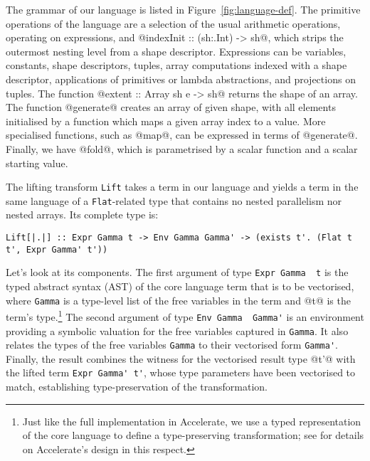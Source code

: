 The grammar of our language is listed in Figure~\ref{fig:language-def}. The primitive operations of the language are a selection of the usual arithmetic operations, operating on expressions, and @indexInit :: (sh:.Int) -> sh@, which strips the outermost nesting level from a shape descriptor. Expressions can be variables, constants, shape descriptors, tuples, array computations indexed with a shape descriptor, applications of primitives or lambda abstractions, and projections on tuples. The function @extent :: Array sh e -> sh@ returns the shape of an array. The function @generate@ creates an array of given shape, with all elements initialised by a function which maps a given array index to a value. More specialised functions, such as @map@, can be expressed in terms of @generate@. Finally, we have @fold@, which is parametrised by a scalar function and a scalar starting value.

The lifting transform \lstinline[style=ndp]{Lift} takes a term in our language and yields a term in the same language of a \lstinline[style=ndp]{Flat}-related type that contains no nested parallelism nor nested arrays. Its complete type is:
%
\begin{lstlisting}[style=ndp]
Lift[|.|] :: Expr Gamma t -> Env Gamma Gamma' -> (exists t'. (Flat t t', Expr Gamma' t'))
\end{lstlisting}
%
Let's look at its components. The first argument of type \lstinline[style=ndp]{Expr Gamma  t} is the typed abstract syntax (AST) of the core language term that is to be vectorised, where \lstinline[style=ndp]{Gamma} is a type-level list of the free variables in the term and @t@ is the term's type.\footnote{Just like the full implementation in Accelerate, we use a typed representation of the core language to define a type-preserving transformation; see \citet{McDonell:2015:acc-llvm} for details on Accelerate's design in this respect.} The second argument of type \lstinline[style=ndp]{Env Gamma  Gamma'} is an environment providing a symbolic valuation for the free variables captured in \lstinline[style=ndp]{Gamma}. It also relates the types of the free variables \lstinline[style=ndp]{Gamma} to their vectorised form \lstinline[style=ndp]{Gamma'}. Finally, the result combines the witness for the vectorised result type @t'@ with the lifted term \lstinline[style=ndp]{Expr Gamma' t'}, whose type parameters have been vectorised to match, establishing type-preservation of the transformation.

